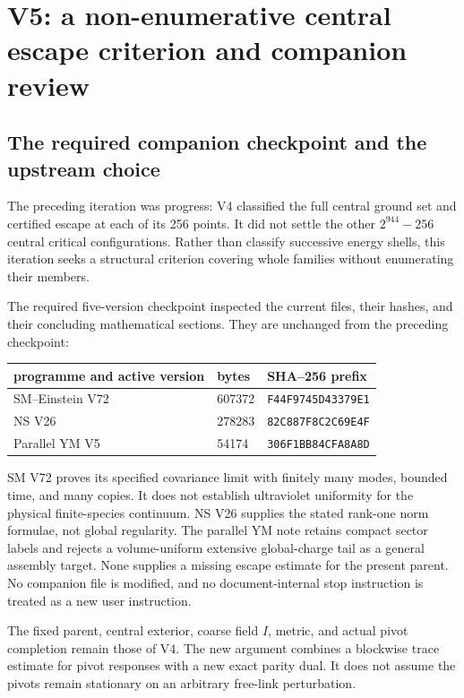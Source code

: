 \documentclass[11pt,oneside]{article}
\begin{document}
\section{V5: a non-enumerative central escape criterion and companion review}
\label{sec:f13v5}

\subsection{The required companion checkpoint and the upstream choice}

The preceding iteration was progress: V4 classified the full
central ground set and certified escape at each of its 256
points. It did not settle the other \(2^{944}-256\) central
critical configurations. Rather than classify successive
energy shells, this iteration seeks a structural criterion
covering whole families without enumerating their members.

The required five-version checkpoint inspected the current
files, their hashes, and their concluding mathematical
sections. They are unchanged from the preceding checkpoint:
\begin{center}\small
\begin{tabular}{lll}
\toprule
programme and active version&bytes&SHA--256 prefix\\
\midrule
SM--Einstein V72&607372&\texttt{F44F9745D43379E1}\\
NS V26&278283&\texttt{82C887F8C2C69E4F}\\
Parallel YM V5&54174&\texttt{306F1BB84CFA8A8D}\\
\bottomrule
\end{tabular}
\end{center}
SM V72 proves its specified covariance limit with
finitely many modes, bounded time, and many copies.
It does not establish ultraviolet uniformity for the
physical finite-species continuum. NS V26 supplies the
stated rank-one norm formulae, not global regularity.
The parallel YM note retains compact sector labels and
rejects a volume-uniform extensive global-charge tail
as a general assembly target. None supplies a missing
escape estimate for the present parent. No companion
file is modified, and no document-internal stop instruction
is treated as a new user instruction.

The fixed parent, central exterior, coarse field \(I\),
metric, and actual pivot completion remain those of V4.
The new argument combines a blockwise trace estimate
for pivot responses with a new exact parity dual. It
does not assume the pivots remain stationary on an
arbitrary free-link perturbation.
\end{document}
